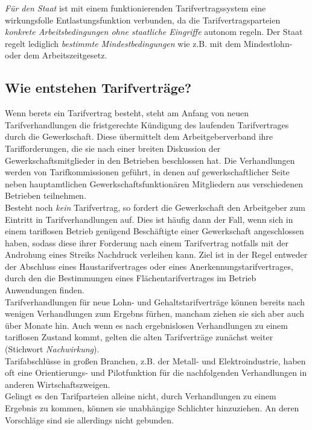 \documentclass[a4paper, 12pt]{report}
\begin{document}
\begin{multicols}{2}
\emph{Für den Staat} ist mit einem funktionierenden Tarifvertragssystem eine
wirkungsfolle Entlastungsfunktion verbunden, da die Tarifvertragsparteien
\emph{konkrete Arbeitsbedingungen ohne staatliche Eingriffe} autonom regeln.
Der Staat regelt lediglich \emph{bestimmte Mindestbedingungen} wie z.B.
mit dem Mindestlohn- oder dem Arbeitszeitgesetz.

\subsection{Wie entstehen Tarifverträge?}

Wenn berets ein Tarifvertrag besteht, steht am Anfang von neuen
Tarifverhandlungen die fristgerechte Kündigung des laufenden Tarifvertrages
durch die Gewerkschaft. Diese übermittelt dem Arbeitgeberverband ihre
Tarifforderungen, die sie nach einer breiten Diskussion der
Gewerkschaftsmitglieder in den Betrieben beschlossen hat. Die Verhandlungen
werden von Tarifkommissionen geführt, in denen auf gewerkschaftlicher Seite
neben hauptamtlichen Gewerkschaftsfunktionären Mitgliedern aus verschiedenen
Betrieben teilnehmen. \\

Besteht noch \emph{kein} Tarifvertrag, so fordert die Gewerkschaft den
Arbeitgeber zum Eintritt in Tarifverhandlungen auf. Dies ist häufig dann der
Fall, wenn sich in einem tariflosen Betrieb genügend Beschäftigte einer
Gewerkschaft angeschlossen haben, sodass diese ihrer Forderung nach einem
Tarifvertrag notfalls mit der Androhung eines Streiks Nachdruck verleihen kann.
Ziel ist in der Regel entweder der Abschluss eines Haustarifvertrages oder eines
Anerkennungstarifvertrages, durch den die Bestimmungen eines
Flächentarifvertrages im Betrieb Anwendungen finden. \\

Tarifverhandlungen für neue Lohn- und Gehaltstarifverträge können bereits nach
wenigen Verhandlungen zum Ergebns fürhen, mancham ziehen sie sich aber auch über
Monate hin. Auch wenn es nach ergebnislosen Verhandlungen zu einem
\glqq tariflosen \grqq{} Zustand kommt, gelten die alten Tarifverträge zunächst
weiter (Stichwort \emph{Nachwirkung}). \\

Tarifabschlüsse in großen Branchen, z.B. der Metall- und Elektroindustrie, haben
oft eine Orientierungs- und Pilotfunktion für die nachfolgenden Verhandlungen in
anderen Wirtschaftszweigen. \\

Gelingt es den Tarifparteien alleine nicht, durch Verhandlungen zu einem
Ergebnis zu kommen, können sie unabhängige Schlichter hinzuziehen. An deren
Vorschläge sind sie allerdings nicht gebunden. \\


\end{multicols}
\end{document}
